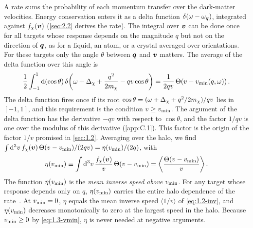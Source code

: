 A rate sums the probability of each momentum transfer over the dark-matter velocities. Energy conservation enters it as a delta function $\delta(\omega - \omega_{\bm{q}})$, integrated against $f_\chi(\bm{v})$ (\cref{sec:2.2} derives the rate). The integral over $\bm{v}$ can be done once for all targets whose response depends on the magnitude $q$ but not on the direction of $\bm{q}$, as for a liquid, an atom, or a crystal averaged over orientations. For these targets only the angle $\theta$ between $\bm{q}$ and $\bm{v}$ matters. The average of the delta function over this angle is
\begin{equation*}
  \frac12\int_{-1}^{1} \mathrm{d}(\cos\theta)\, \delta\!\left(\omega + \Delta_\chi + \frac{q^2}{2m_{\chi}} - qv\cos\theta\right)
  = \frac{1}{2qv}\,\Theta\!\left(v - v_{\mathrm{min}}(q, \omega)\right).
\end{equation*}
The delta function fires once if its root $\cos\theta = (\omega + \Delta_\chi + q^2/2m_{\chi})/qv$ lies in $[-1, 1]$, and this requirement is the condition $v \ge v_{\mathrm{min}}$. The argument of the delta function has the derivative $-qv$ with respect to $\cos\theta$, and the factor $1/qv$ is one over the modulus of this derivative (\cref{app:C.1}). This factor is the origin of the factor $1/v$ promised in \cref{sec:1.2}. Averaging over the halo, we find $\int \mathrm{d}^3 v\, f_\chi(\bm{v})\,\Theta(v - v_{\mathrm{min}})/(2qv) = \eta(v_{\mathrm{min}})/(2q)$, with
\begin{equation}
  \eta(v_{\mathrm{min}}) \equiv \int \mathrm{d}^3 v\, \frac{f_\chi(\bm{v})}{v}\,\Theta(v - v_{\mathrm{min}}) = \left\langle \frac{\Theta(v - v_{\mathrm{min}})}{v}\right\rangle.
  \label{eq:1.3-eta}
\end{equation}
The function $\eta(v_{\mathrm{min}})$ is the \emph{mean inverse speed above} $v_{\mathrm{min}}$. For any target whose response depends only on $q$, $\eta(v_{\mathrm{min}})$ carries the entire halo dependence of the rate~\cites[below Eq.~(5)]{essig2012direct}[Eqs.~(11) and (12)]{kahn2022searches}[Eqs.~(A.12)--(A.15)]{essig2016direct}. At $v_{\mathrm{min}} = 0$, $\eta$ equals the mean inverse speed $\langle 1/v\rangle$ of \cref{eq:1.2-inv}, and $\eta(v_{\mathrm{min}})$ decreases monotonically to zero at the largest speed in the halo. Because $v_{\mathrm{min}} \ge 0$ by \cref{eq:1.3-vmin}, $\eta$ is never needed at negative arguments.

